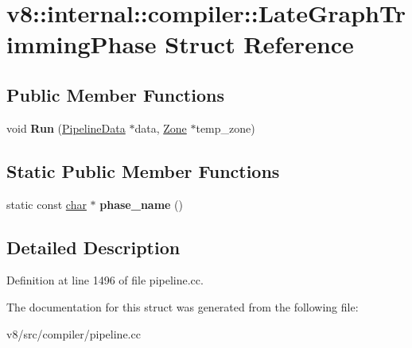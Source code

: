 \hypertarget{structv8_1_1internal_1_1compiler_1_1LateGraphTrimmingPhase}{}\section{v8\+:\+:internal\+:\+:compiler\+:\+:Late\+Graph\+Trimming\+Phase Struct Reference}
\label{structv8_1_1internal_1_1compiler_1_1LateGraphTrimmingPhase}
\subsection*{Public Member Functions}
\begin{DoxyCompactItemize}
\item 
\mbox{\label{structv8_1_1internal_1_1compiler_1_1LateGraphTrimmingPhase_abe3932edc48435c706e1ad6265b9667d}} 
void {\bfseries Run} (\mbox{\hyperlink{classv8_1_1internal_1_1compiler_1_1PipelineData}{Pipeline\+Data}} $\ast$data, \mbox{\hyperlink{classv8_1_1internal_1_1Zone}{Zone}} $\ast$temp\+\_\+zone)
\end{DoxyCompactItemize}
\subsection*{Static Public Member Functions}
\begin{DoxyCompactItemize}
\item 
\mbox{\label{structv8_1_1internal_1_1compiler_1_1LateGraphTrimmingPhase_acf945294496b5d8082219504828e9312}} 
static const \mbox{\hyperlink{classchar}{char}} $\ast$ {\bfseries phase\+\_\+name} ()
\end{DoxyCompactItemize}


\subsection{Detailed Description}


Definition at line 1496 of file pipeline.\+cc.



The documentation for this struct was generated from the following file\+:\begin{DoxyCompactItemize}
\item 
v8/src/compiler/pipeline.\+cc\end{DoxyCompactItemize}
